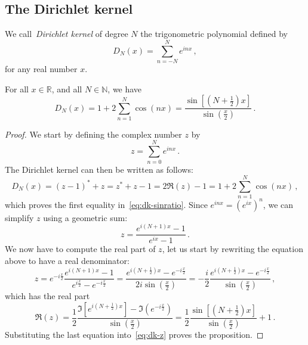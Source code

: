 \subsection{The Dirichlet kernel}
\begin{definition}
  We call~\emph{Dirichlet kernel} of degree $N$ the trigonometric polynomial defined by
  \begin{equation}
    D_N(x)=\sum_{n=-N}^{N}e^{inx}\,,\label{eq:dk-def}
  \end{equation}
  for any real number $x$.
\end{definition}
\begin{proposition}
  \label{prop:dirichlet-id}
  For all $x\in\mathbb{R}$, and all $N\in\mathbb{N}$, we have
  \begin{equation}
    D_N(x)=1+2\sum_{n=1}^{N}\cos(nx)=\frac{\sin[(N+\frac{1}{2})x]}{\sin(\frac{x}{2})}\,.
    \label{eq:dk-sinratio}
  \end{equation}
\end{proposition}
\begin{proof}
  We start by defining the complex number $z$ by
  \begin{equation}
    z=\sum_{n=0}^Ne^{inx}\,.
  \end{equation}
  The Dirichlet kernel can then be written as follows:
  \begin{equation}
    D_N(x)=(z-1)^*+z=z^*+z-1=2\Re(z)-1=1+2\sum_{n=1}^{N}\cos(nx)\,,\label{eq:dk-z}
  \end{equation}
  which proves the first equality in~\cref{eq:dk-sinratio}.
  Since $e^{inx}=(e^{ix})^n$, we can simplify $z$ using a geometric sum:
  \begin{equation}
    z=\frac{e^{i(N+1)x}-1}{e^{ix}-1}\,.\label{eq:dk-geosum}
  \end{equation}
  We now have to compute the real part of $z$, let us start by rewriting the equation above to have a real denominator:
  \begin{equation}
    z=e^{-i\frac{x}{2}}\frac{e^{i(N+1)x}-1}{e^{i\frac{x}{2}}-e^{-i\frac{x}{2}}}
    =\frac{e^{i(N+\frac12)x}-e^{-i\frac{x}{2}}}{2i\sin(\frac{x}{2})}
    =-\frac{i}{2}\frac{e^{i(N+\frac12)x}-e^{-i\frac{x}{2}}}{\sin(\frac{x}{2})}\,,
  \end{equation}
  which has the real part
  \begin{equation}
    \Re(z)=\frac12\frac{\Im[e^{i(N+\frac12)x}]-\Im(e^{-i\frac{x}{2}})}{\sin(\frac{x}{2})}
    =\frac12\frac{\sin[(N+\frac{1}{2})x]}{\sin(\frac{x}{2})}+1\,.
  \end{equation}
  Substituting the last equation into~\cref{eq:dk-z} proves the proposition.
\end{proof}
